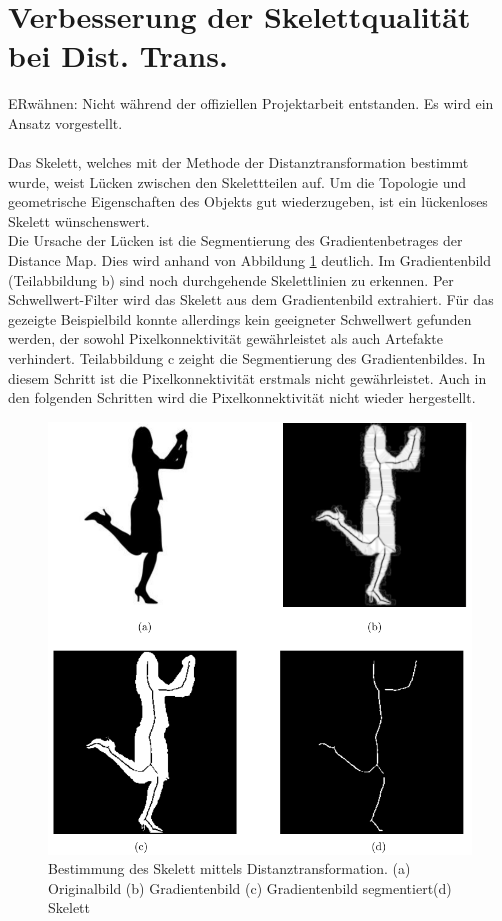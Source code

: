 \section{Verbesserung der Skelettqualität bei Dist. Trans.}
ERwähnen: Nicht während der offiziellen Projektarbeit entstanden. Es wird ein Ansatz vorgestellt.\\\\
Das Skelett, welches mit der Methode der Distanztransformation bestimmt wurde, weist Lücken zwischen den Skelettteilen auf. Um die Topologie und geometrische Eigenschaften des Objekts gut wiederzugeben, ist ein lückenloses Skelett wünschenswert. \\
Die Ursache der Lücken ist die Segmentierung des Gradientenbetrages der Distance Map. Dies wird anhand von Abbildung \ref{fig:person-skelett} deutlich. Im Gradientenbild (Teilabbildung b) sind noch durchgehende Skelettlinien zu erkennen. Per Schwellwert-Filter wird das Skelett aus dem Gradientenbild extrahiert. Für das gezeigte Beispielbild konnte allerdings kein geeigneter Schwellwert gefunden werden, der sowohl Pixelkonnektivität gewährleistet als auch Artefakte verhindert. Teilabbildung c zeight die Segmentierung des Gradientenbildes. In diesem Schritt ist die Pixelkonnektivität erstmals nicht gewährleistet. Auch in den folgenden Schritten wird die Pixelkonnektivität nicht wieder hergestellt. 
\begin{figure}[htbp]
\centering
\includegraphics[width=1.0\linewidth]{./fig/person_gradienten_problem.pdf}
\caption{Bestimmung des Skelett mittels Distanztransformation. (a) Originalbild (b) Gradientenbild (c) Gradientenbild segmentiert(d) Skelett}
\label{fig:person-skelett}
\end{figure}\\
